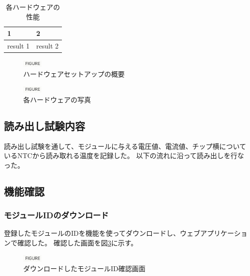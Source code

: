\begin{table}[tbp]
\begin{center}
\caption[各ハードウェアの性能]{各ハードウェアの性能}
\label{readout_setup_table}
  \begin{tabular}{|ll|} \hline
    1 & 2 \\ \hline
    result 1 & result 2 \\ \hline 
  \end{tabular}
\end{center}
\end{table}

\begin{figure}[bpt]\centering
\includegraphics[width=1cm]{figure}
\caption[ハードウェアセットアップの概要]{ハードウェアセットアップの概要}
\label{readout_setup_overview}
\end{figure}

\begin{figure}[bpt]\centering
\includegraphics[width=1cm]{figure}
\caption[各ハードウェアの写真]{各ハードウェアの写真}
\label{readout_setup_picture}
\end{figure}

\subsection{読み出し試験内容}
読み出し試験を通して、モジュールに与える電圧値、電流値、チップ横についているNTCから読み取れる温度を記録した。
以下の流れに沿って読み出しを行なった。

\subsection{機能確認}
\subsubsection{モジュールIDのダウンロード}
登録したモジュールのIDを機能を使ってダウンロードし、ウェブアプリケーションで確認した。
確認した画面を図\ref{download_SCC}に示す。

\begin{figure}[bpt]\centering
\includegraphics[width=1cm]{figure}
\caption[ダウンロードしたモジュールID確認画面]{ダウンロードしたモジュールID確認画面}
\label{download_SCC}
\end{figure}

